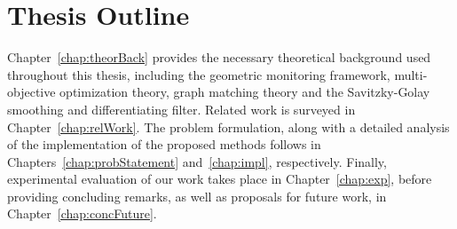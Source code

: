 \section{Thesis Outline} \label{sec:intro-thesisOutline}

Chapter~\ref{chap:theorBack} provides the necessary theoretical background used throughout this thesis, including the geometric monitoring framework, multi-objective optimization theory, graph matching theory and the Savitzky-Golay smoothing and differentiating filter. Related work is surveyed in Chapter~\ref{chap:relWork}. The problem formulation, along with a detailed analysis of the implementation of the proposed methods follows in Chapters~\ref{chap:probStatement} and~\ref{chap:impl}, respectively. Finally, experimental evaluation of our work takes place in Chapter~\ref{chap:exp}, before providing concluding remarks, as well as proposals for future work, in Chapter~\ref{chap:concFuture}.